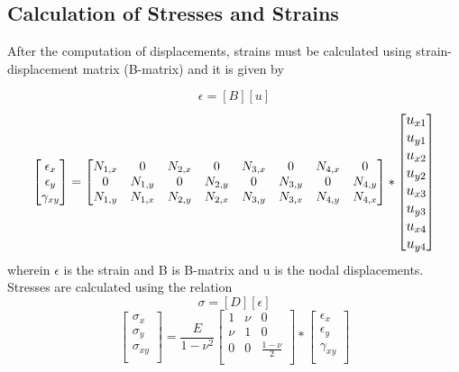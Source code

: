 \documentclass[fleqn, 12.5pt,a4paper]{report}
\begin{document}
\subsection{\color{Black} {Calculation of Stresses and Strains}}
After the computation of displacements, strains must be calculated using strain-displacement matrix (B-matrix) and it is given by

$$\epsilon = [B][u]$$
\vspace{-0.3cm}
$$
\begin{bmatrix}
\epsilon_x\\
\epsilon_y\\
\gamma_{xy}\\
\end{bmatrix}
=
\begin{bmatrix}
N_{1,x} & 0 & N_{2,x} & 0 & N_{3,x} & 0 & N_{4,x} & 0 \\
0 & N_{1,y} & 0 & N_{2,y} & 0 & N_{3,y} & 0 & N_{4,y}\\
N_{1,y} & N_{1,x} & N_{2,y} & N_{2,x} & N_{3,y} & N_{3,x} & N_{4,y} & N_{4,x}
\end{bmatrix}
*
\large \begin{bmatrix}
u_{x1}\\
u_{y1}\\
u_{x2}\\
u_{y2}\\
u_{x3}\\
u_{y3}\\
u_{x4}\\
u_{y4}\\
\end{bmatrix} \large
$$
wherein $\epsilon$ is the strain and B is B-matrix and u is the nodal displacements.
\newline
Stresses are calculated using the relation
$$\sigma = [D][\epsilon]$$
$$
\begin{bmatrix}
\sigma_x\\
\sigma_y\\
\sigma_{xy}\\
\end{bmatrix}
=
\frac{E}{1-\nu^2}
\begin{bmatrix}
1 & \nu & 0\\
\nu & 1 & 0\\
0 & 0 & \frac{1-\nu}{2}\\
\end{bmatrix}
*
\begin{bmatrix}
\epsilon_x\\
\epsilon_y\\
\gamma_{xy}\\
\end{bmatrix}
$$
\end{document}
